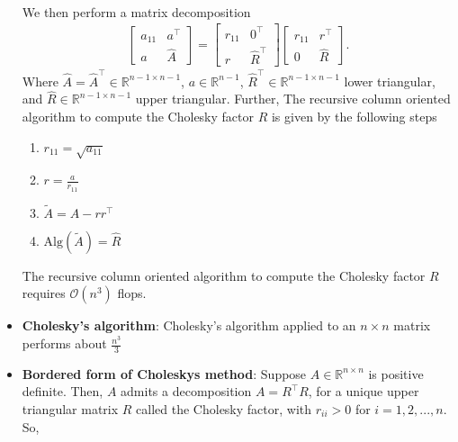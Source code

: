 \documentclass{report}
\begin{document}
\begin{itemize}
\begin{align*}
            \end{align*}
            We then perform a matrix decomposition 
            \begin{align*}
                \begin{bmatrix}
                    a_{11} & a^{\top} \\
                    a & \hat{A}
                \end{bmatrix}
                =
                \begin{bmatrix}
                    r_{11} & 0^{\top} \\
                    r & \hat{R}^{\top}
                \end{bmatrix}
                \begin{bmatrix}
                    r_{11} & r^{\top} \\
                    0 & \hat{R}
                \end{bmatrix}
            .\end{align*}
            Where $\hat{A} = \hat{A}^{\top} \in \mathbb{R}^{n-1 \times n-1}$, $a \in \mathbb{R}^{n-1}$, $\hat{R}^{\top} \in \mathbb{R}^{n-1\times n-1}$ lower triangular, and $\hat{R} \in \mathbb{R}^{n-1\times n-1}$ upper triangular. Further,
            \bigbreak \noindent 
            The recursive column oriented algorithm to compute the Cholesky factor $R$ is given by the following steps
            \begin{enumerate}
                \item $r_{11} = \sqrt{a_{11}}$
                \item $r = \frac{a}{r_{11}} $
                \item $\tilde{A} = \hat{A} - rr^{\top} $
                \item $\text{Alg}(\tilde{A}) = \hat{R} $
            \end{enumerate}
            \bigbreak \noindent 
            The recursive column oriented algorithm to compute the Cholesky factor $R$ requires $\mathcal{O}(n^{3})$ flops.
        \item \textbf{Cholesky's algorithm}: Cholesky's algorithm  applied to an $n \times n$ matrix performs about $\frac{n^{3}}{3} $
        \item \textbf{Bordered form of Choleskys method}: Suppose $A \in \mathbb{R}^{n\times n}$ is positive definite. Then, $A$ admits a decomposition $A = R^{\top}R$, for a unique upper triangular matrix $R$ called the Cholesky factor, with $r_{ii} > 0$ for $i =1,2,...,n$. So,
            \begin{align*}

\end{align*}
\end{itemize}
\end{document}
